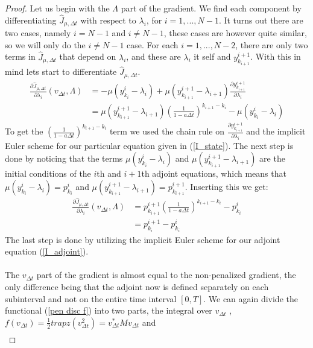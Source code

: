\begin{proof}
Let us begin with the $\Lambda$ part of the gradient. We find each component by differentiating $\hat J_{\mu,\Delta t} $ with respect to $\lambda_i$, for $i=1,...,N-1$. It turns out there are two cases, namely $i=N-1$ and $i\neq N-1$, these cases are however quite similar, so we will only do the $i\neq N-1$ case. For each $i=1,...,N-2$, there are only two terms in $\hat J_{\mu,\Delta t} $ that depend on $\lambda_i$, and these are $\lambda_i$ it self and $y_{k_{i+1}}^{i+1}$. With this in mind lets start to differentiate $\hat J_{\mu,\Delta t} $.
\begin{align*}
\frac{\partial\hat J_{\mu,\Delta t}}{\partial \lambda_i}(v_{\Delta t},\Lambda) &=-\mu (y_{k_i}^i-\lambda_i) +\mu(y_{k_{i+1}}^{i+1}-\lambda_{i+1})\frac{\partial y_{k_{i+1}}^{i+1}}{\partial \lambda_i}  \\
&=\mu(y_{k_{i+1}}^{i+1}-\lambda_{i+1})(\frac{1}{1-a\Delta t})^{k_{i+1}-k_i} -\mu (y_{k_i}^i-\lambda_i)
\end{align*}
To get the $(\frac{1}{1-a\Delta t})^{k_{i+1}-k_i}$ term we used the chain rule on $\frac{\partial y_{k_{i+1}}^{i+1}}{\partial \lambda_i}$ and the implicit Euler scheme for our particular equation given in (\ref{I_state}). The next step is done by noticing that the terms $\mu (y_{k_i}^i-\lambda_i)$ and $\mu(y_{k_{i+1}}^{i+1}-\lambda_{i+1})$ are the initial conditions of the $i$th and $i+1$th adjoint equations, which means that $\mu (y_{k_i}^i-\lambda_i)=p_{k_i}^{i}$ and $\mu(y_{k_{i+1}}^{i+1}-\lambda_{i+1})=p_{k_{i+1}}^{i+1}$. Inserting this we get:
\begin{align*}
\frac{\partial\hat J_{\mu,\Delta t}}{\partial \lambda_i}(v_{\Delta t},\Lambda) &=p_{k_{i+1}}^{i+1}(\frac{1}{1-a\Delta t})^{k_{i+1}-k_i} -p_{k_i}^{i} \\
&= p_{k_{i}}^{i+1}-p_{k_i}^{i}
\end{align*}
The last step is done by utilizing the implicit Euler scheme for our adjoint equation (\ref{I_adjoint}).
\\
\\
The $v_{\Delta t}$ part of the gradient is almost equal to the non-penalized gradient, the only difference being that the adjoint now is defined separately on each subinterval and not on the entire time interval $[0,T]$. We can again divide the functional (\ref{pen disc f}) into two parts, the integral over $v_{\Delta t}$ , $f(v_{\Delta t})=\frac{1}{2} trapz(v_{\Delta t}^2)=v_{\Delta t}^*Mv_{\Delta t}$ and 
\begin{align*}

\end{align*}
\end{proof}
